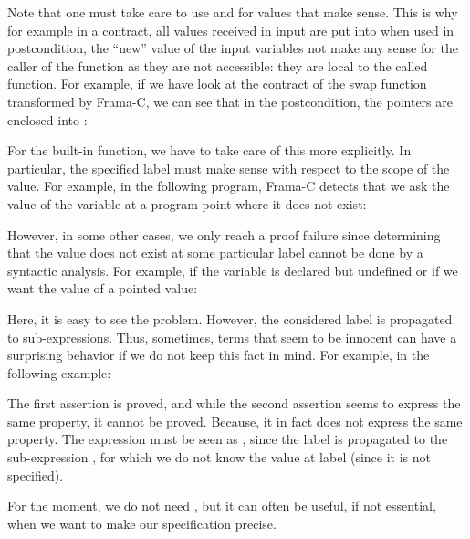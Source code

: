 Note that one must take care to use  and
 for values that make sense. This is why
for example in a contract, all values received in input are put into
 when used in postcondition, the ``new''
value of the input variables not make any sense for the caller of the
function as they are not accessible: they are local to the called function.
For example, if we have look at the contract of the swap function transformed
by Frama-C, we can see that in the postcondition, the pointers are enclosed into
:




For the built-in  function, we have to take care
of this more explicitly. In particular,
the specified label must make sense with respect to the scope of the
value. For example, in the following program, Frama-C detects that we ask
the value of the variable  at a program point where it does
not exist:






However, in some other cases, we only reach a proof failure since determining
that the value does not exist at some particular label cannot be done by
a syntactic analysis. For example, if the variable is declared but undefined
or if we want the value of a pointed value:




Here, it is easy to see the problem. However, the considered label is
propagated to sub-expressions. Thus, sometimes, terms that seem to be
innocent can have a surprising behavior if we do not keep this fact in mind.
For example, in the following example:




The first assertion is proved, and while the second assertion seems to
express the same property, it cannot be proved. Because, it in fact does not
express the same property. The expression
 must be seen as
, since the
label is propagated to the sub-expression , for which we do
not know the value at label  (since it is not specified).


For the moment, we do not need , but it can
often be useful, if not essential, when we want to make our
specification precise.



